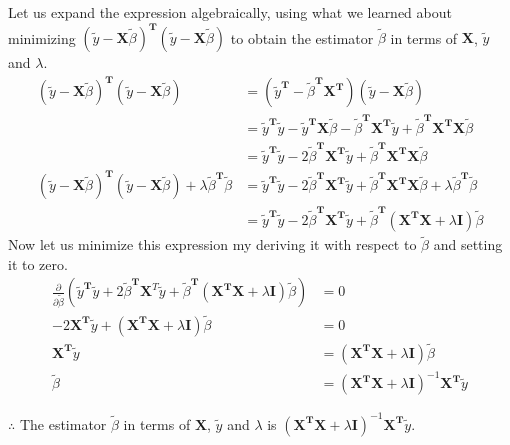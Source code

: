 \documentclass[12pt]{article}
\newcommand{\ytilde}{\tilde{y}}
\newcommand{\X}{\mathbf{X}}
\newcommand{\btilde}{\tilde{\beta}}
\newcommand{\xtx}{\X^{\T}\X}
\newcommand{\I}{\mathbf{I}}
\newcommand{\T}{\mathbf{T}}
\begin{document}
\begin{enumerate}[1.]
\begin{enumerate}[a)]
                Let us expand the expression algebraically, using what we learned about minimizing 
                $(\ytilde - \X \btilde)^\T(\ytilde - \X \btilde)$ to obtain the estimator $\btilde$ in terms of $\X$, $\ytilde$ and $\lambda$.
                \begin{align*}
                    (\ytilde - \X \btilde)^\T(\ytilde - \X \btilde) &= (\ytilde^\T - \btilde^\T \X^\T)(\ytilde - \X \btilde) \\
                    &= \ytilde^\T \ytilde - \ytilde^\T \X \btilde - \btilde^\T \X^\T \ytilde + \btilde^\T \X^\T \X \btilde \\
                    &= \ytilde^\T \ytilde - 2\btilde^\T \X^\T \ytilde + \btilde^\T \X^\T \X \btilde\\ 
                    (\ytilde - \X \btilde)^\T(\ytilde - \X \btilde) + \lambda \btilde^\T \btilde 
                    &= \ytilde^\T \ytilde - 2\btilde^\T \X^\T \ytilde + \btilde^\T \X^\T \X \btilde + \lambda \btilde^\T \btilde \\
                    &= \ytilde^\T \ytilde - 2\btilde^\T \X^\T \ytilde + \btilde^\T (\X^\T \X + \lambda \I) \btilde
                \end{align*}
                Now let us minimize this expression my deriving it with respect to $\btilde$ and setting it to zero.
                \begin{align*}
                    \frac{\partial}{\partial \btilde} ( \ytilde^\T \ytilde  + 2\btilde^\T \X^T \ytilde + \btilde^\T (\xtx + \lambda \I)\btilde) &= 0 \\
                    - 2 \X^\T \ytilde + (\X^\T \X + \lambda \I) \btilde &= 0 \\
                    \X^\T \ytilde &= (\X^\T \X + \lambda \I) \btilde \\
                    \btilde &= (\X^\T \X + \lambda \I)^{-1} \X^\T \ytilde
                \end{align*}

                $\therefore$ The estimator $\btilde$ in terms of $\X$, $\ytilde$ and $\lambda$ is 
                $(\X^\T \X + \lambda \I)^{-1} \X^\T \ytilde$.


\end{enumerate}
\end{enumerate}
\end{document}
